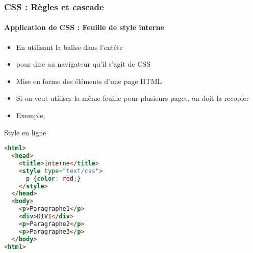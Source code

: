 \documentclass[xcolor=table]{beamer}
\begin{document}
\begin{frame}[fragile]
\frametitle{CSS : Règles et cascade}
\framesubtitle{Application de CSS : Feuille de style interne}

\begin{minipage}{0.60\textwidth} 
	\begin{itemize}
		\item En utilisant la balise  dans l'entête
		\item {} pour dire au navigateur qu'il s'agit de CSS
		\item Mise en forme des éléments d'une page HTML
		\item Si on veut utiliser la même feuille pour plusieurs pages, on doit la recopier
		\item Exemple, 
	\end{itemize}
\end{minipage}
%
\begin{minipage}{0.38\textwidth}
\begin{exampleblock}{Style en ligne}
\lstset{escapeinside=**}
\scriptsize\bfseries
\begin{lstlisting}[language={html}]
<html>
  <head>
    <title>interne</title>
    <style type="text/css">
      p {color: red;}
    </style>
  </head>
  <body>
    <p>Paragraphe1</p>
    <div>DIV1</div>
    <p>Paragraphe2</p>
    <p>Paragraphe3</p>
  </body>
<html>
\end{lstlisting}
\end{exampleblock}
\end{minipage}
\end{frame}
\end{document}
